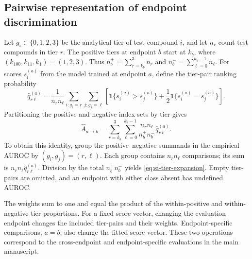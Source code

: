 \subsection*{Pairwise representation of endpoint discrimination}
Let \(g_i\in\{0,1,2,3\}\) be the analytical tier of test compound \(i\), and let \(n_r\) count test compounds in tier \(r\). The positive tiers at endpoint \(b\) start at \(k_b\), where \((k_{100},k_{11},k_1)=(1,2,3)\). Thus \(n_b^+=\sum_{r=k_b}^{3}n_r\) and \(n_b^-=\sum_{\ell=0}^{k_b-1}n_\ell\). For scores \(s_i^{(a)}\) from the model trained at endpoint \(a\), define the tier-pair ranking probability
\begin{equation}
\widehat q_{r\ell}^{(a)}
=\frac{1}{n_rn_\ell}
\sum_{i:g_i=r}\sum_{j:g_j=\ell}
\left[\mathbf1\{s_i^{(a)}>s_j^{(a)}\}
+\frac12\mathbf1\{s_i^{(a)}=s_j^{(a)}\}\right].
\label{eq:si-tier-pair}
\end{equation}
Partitioning the positive and negative index sets by tier gives
\begin{equation}
\widehat A_{a\to b}
=\sum_{r=k_b}^{3}\sum_{\ell=0}^{k_b-1}
\frac{n_rn_\ell}{n_b^+n_b^-}\widehat q_{r\ell}^{(a)}.
\label{eq:si-tier-expansion}
\end{equation}
To obtain this identity, group the positive--negative summands in the empirical AUROC by \((g_i,g_j)=(r,\ell)\). Each group contains \(n_rn_\ell\) comparisons; its sum is \(n_rn_\ell\widehat q_{r\ell}^{(a)}\). Division by the total \(n_b^+n_b^-\) yields \eqref{eq:si-tier-expansion}. Empty tier-pairs are omitted, and an endpoint with either class absent has undefined AUROC.

The weights sum to one and equal the product of the within-positive and within-negative tier proportions. For a fixed score vector, changing the evaluation endpoint changes the included tier-pairs and their weights. Endpoint-specific comparisons, \(a=b\), also change the fitted score vector. These two operations correspond to the cross-endpoint and endpoint-specific evaluations in the main manuscript.

